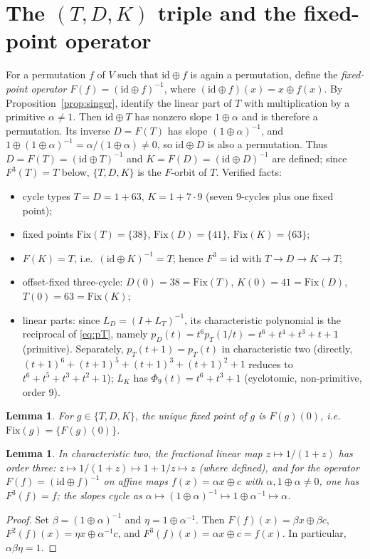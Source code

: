 \documentclass[11pt]{article}
\newtheorem{lemma}[theorem]{Lemma}
\begin{document}
\section[The (T,D,K) triple and the fixed-point operator]{The $(T,D,K)$ triple and the fixed-point operator}\label{sec:tdk}
For a permutation $f$ of $V$ such that $\mathrm{id}\oplus f$ is again a permutation,
define the \emph{fixed-point operator} $F(f)=(\mathrm{id}\oplus f)^{-1}$, where
$(\mathrm{id}\oplus f)(x)=x\oplus f(x)$. By Proposition~\ref{prop:singer},
identify the linear part of $T$ with multiplication by a primitive
$\alpha\ne1$. Then $\mathrm{id}\oplus T$ has nonzero slope
$1\oplus\alpha$ and is therefore a permutation. Its inverse $D=F(T)$ has slope
$(1\oplus\alpha)^{-1}$, and
$1\oplus(1\oplus\alpha)^{-1}=\alpha/(1\oplus\alpha)\ne0$, so
$\mathrm{id}\oplus D$ is also a permutation. Thus
$D=F(T)=(\mathrm{id}\oplus T)^{-1}$ and $K=F(D)=(\mathrm{id}\oplus D)^{-1}$ are
defined; since $F^3(T)=T$ below, $\{T,D,K\}$ is the $F$-orbit of $T$.
Verified facts:
\begin{itemize}
\item cycle types $T=D=1+63$, $K=1+7\cdot 9$ (seven $9$-cycles plus one fixed point);
\item fixed points $\mathrm{Fix}(T)=\{38\}$, $\mathrm{Fix}(D)=\{41\}$,
$\mathrm{Fix}(K)=\{63\}$;
\item $F(K)=T$, i.e.\ $(\mathrm{id}\oplus K)^{-1}=T$; hence $F^3=\mathrm{id}$ with
$T\to D\to K\to T$;
\item offset-fixed three-cycle: $D(0)=38=\mathrm{Fix}(T)$,
$K(0)=41=\mathrm{Fix}(D)$, $T(0)=63=\mathrm{Fix}(K)$;
\item linear parts: since $L_D=(I+L_T)^{-1}$, its characteristic polynomial is
the reciprocal of \eqref{eq:pT}, namely
$p_D(t)=t^6p_T(1/t)=t^6+t^4+t^3+t+1$ (primitive). Separately,
$p_T(t+1)=p_T(t)$ in characteristic two (directly,
$(t+1)^6+(t+1)^5+(t+1)^3+(t+1)^2+1$ reduces to
$t^6+t^5+t^3+t^2+1$); $L_K$ has $\Phi_9(t)=t^6+t^3+1$
(cyclotomic, non-primitive, order $9$).
\end{itemize}
\begin{lemma}\label{lem:fp}
For $g\in\{T,D,K\}$, the unique fixed point of $g$ is $F(g)(0)$, i.e.~
$\mathrm{Fix}(g)=\{F(g)(0)\}$.
\end{lemma}

\begin{lemma}\label{lem:F3}
In characteristic two, the fractional linear map $z\mapsto1/(1+z)$ has order three:
$z\mapsto1/(1+z)\mapsto1+1/z\mapsto z$ (where defined), and for the operator $F(f)=(\mathrm{id}\oplus f)^{-1}$ on affine maps
$f(x)=\alpha x\oplus c$ with $\alpha,1\oplus\alpha\ne0$, one has $F^3(f)=f$; the
slopes cycle as $\alpha\mapsto(1\oplus\alpha)^{-1}\mapsto1\oplus\alpha^{-1}\mapsto\alpha$.
\end{lemma}
\begin{proof}
Set $\beta=(1\oplus\alpha)^{-1}$ and $\eta=1\oplus\alpha^{-1}$. Then
$F(f)(x)=\beta x\oplus\beta c$,
$F^2(f)(x)=\eta x\oplus\alpha^{-1}c$, and
$F^3(f)(x)=\alpha x\oplus c=f(x)$. In particular,
$\alpha\beta\eta=1$.
\end{proof}
\end{document}
